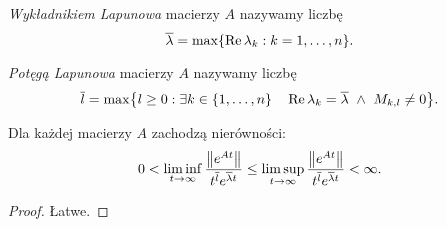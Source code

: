 %
\begin{definition}
  \emph{Wykładnikiem Lapunowa} macierzy $A$ nazywamy liczbę
  \begin{equation*}
    \overline{\lambda} = \max \{ \real \lambda_k : k = 1, \ldots, n \}.
  \end{equation*}
\end{definition}
%
\begin{definition}
  \emph{Potęgą Lapunowa} macierzy $A$ nazywamy liczbę
  \begin{equation*}
    \overline{l} = \max \bigl\{ l \geq 0 : \exists k \in \{1,\ldots,n\} \quad \real \lambda_k = \overline{\lambda} 
    \ \wedge \ M_{k,l} \not= 0 \bigr\}.
  \end{equation*}
\end{definition}
%
\begin{theorem}
  Dla każdej macierzy $A$ zachodzą nierówności:
  \begin{equation*}
    0 < \liminf_{t\to\infty} \frac{\norm*{e^{At}}}{t^{\overline{l}} e^{\overline{\lambda} t}} \leq
    \limsup_{t\to\infty} \frac{\norm*{e^{At}}}{t^{\overline{l}} e^{\overline{\lambda} t}} < \infty.
  \end{equation*}
\end{theorem}
%
\begin{proof}
  Łatwe.
\end{proof}
































